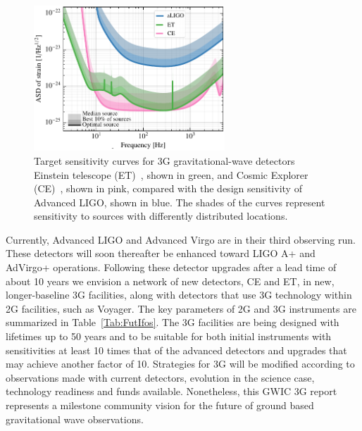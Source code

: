 \begin{figure}
\centering
\includegraphics*[width= 0.64\textwidth]{Figures/noises_percentiles-Voyager.pdf}
\caption{Target sensitivity curves for 3G gravitational-wave detectors Einstein telescope (ET)~\cite{ET2011}, shown in green, and Cosmic Explorer (CE)~\cite{CosmicExplorer2017}, shown in pink, compared with the design sensitivity of Advanced LIGO, shown in blue. 
The shades of the curves represent sensitivity to sources with differently distributed locations.}
\label{fig:3GSens}
\end{figure}

Currently, Advanced LIGO and Advanced Virgo are in their third observing run. These detectors will soon thereafter be enhanced toward LIGO A+ and AdVirgo+ operations. Following these detector upgrades after a lead time of about 10 years we envision a network of new detectors, CE and ET, in new, longer-baseline 3G facilities, along with detectors that use 3G technology within 2G facilities, such as Voyager.
The key parameters of 2G and 3G instruments are summarized in Table~\ref{Tab:FutIfos}.
The 3G facilities are being designed with lifetimes up to 50 years and to be suitable for both initial instruments with sensitivities at least 10 times that of the advanced detectors and upgrades that may achieve another factor of 10.
Strategies for 3G will be modified according to observations made with current detectors, evolution in the science case, technology readiness and funds available. Nonetheless, this GWIC 3G report represents a milestone community vision for the future of ground based gravitational wave observations. 




